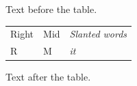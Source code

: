 \documentclass[12pt]{article}
\begin{document}
Text before the table.

\begin{tabular}{w{r}{2cm}|w{c}{1.5cm}|>{\itshape}l}Right & Mid & Slanted words\\R & M & it\end{tabular}

Text after the table.
\end{document}
